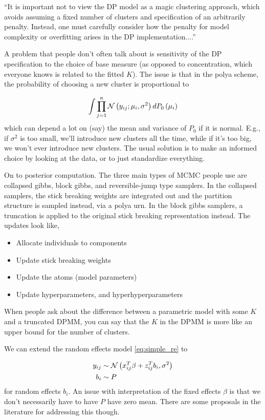 \documentclass{article}
\begin{document}
``It is important not to view the DP model as a magic clustering approach, which
avoids assuming a fixed number of clusters and specification of an arbitrarily
penalty. Instead, one must carefully consider how the penalty for model
complexity or overfitting arises in the DP implementation....''

A problem that people don't often talk about is sensitivity of the DP
specification to the choice of base measure (as opposed to concentration, which
everyone knows is related to the fitted $K$). The issue is that in the polya
scheme, the probability of choosing a new cluster is proportional to

\begin{align}
\int \prod_{j = 1}^{n} \mathcal{N}\left(y_{ij}; \mu_{i}, \sigma^{2}\right) dP_{0}\left(\mu_{i}\right)
\end{align}
which can depend a lot on (say) the mean and variance of $P_{0}$ if it is
normal. E.g., if $\sigma^{2}$ is too small, we'll introduce new clusters all the
time, while if it's too big, we won't ever introduce new clusters. The usual
solution is to make an informed choice by looking at the data, or to just
standardize everything.

On to posterior computation. The three main types of MCMC people use are
collapsed gibbs, block gibbs, and reversible-jump type samplers. In the
collapsed samplers, the stick breaking weights are integrated out and the
partition structure is sampled instead, via a polya urn. In the block gibbs
samplers, a truncation is applied to the original stick breaking representation
instead. The updates look like,

\begin{itemize}
\item Allocate individuals to components
\item Update stick breaking weights
\item Update the atoms (model parameters)
\item Update hyperparameters, and hyperhyperparameters
\end{itemize}

When people ask about the difference between a parametric model with some $K$
and a truncated DPMM, you can say that the $K$ in the DPMM is more like an upper
bound for the number of clusters.

We can extend the random effects model \ref{eq:simple_re} to

\begin{align}
  y_{ij} &\sim \mathcal{N}\left(x_{ij}^{T}\beta + z_{ij}^{T}b_{i}, \sigma^{2}\right)\\
  b_{i} &\sim P
\end{align}
for random effects $b_{i}$. An issue with interpretation of the fixed effects
$\beta$ is that we don't necessarily have to have $P$ have zero mean. There are
some proposals in the literature for addressing this though.
\end{document}
